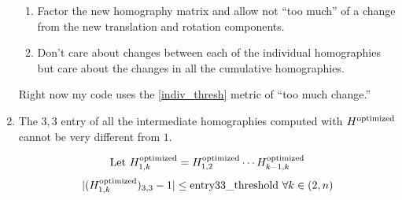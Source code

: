 \documentclass{article}
\begin{document}
\begin{enumerate}
\begin{enumerate}
\item Factor the new homography matrix and allow not ``too much'' of a change
from the new translation and rotation components.   

\item Don't care about changes between each of the individual homographies but
care about the changes in all the cumulative homographies. 

\end{enumerate} 

Right now my code uses the \ref{indiv_thresh} metric of ``too much change.''

\item The $3, 3$ entry of all the intermediate homographies computed with
$H^{\textnormal{optimized}}$ cannot be very different from $1$.

\[\textnormal{Let } H_{1, k}^{\textnormal{optimized}} = H_{1, 2}^{\textnormal{optimized}} \cdots H_{k - 1, k}^{\textnormal{optimized}}\]
\[|(H_{1, k}^{\textnormal{optimized}})_{3, 3} - 1| \leq \textnormal{entry33\_threshold } \forall k \in (2, n)\]

\end{enumerate}
\end{document}
